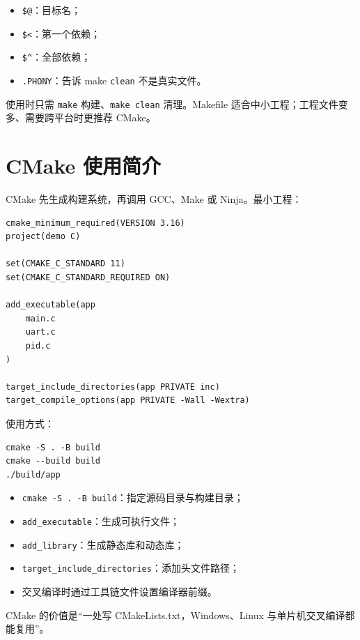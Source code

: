 \begin{itemize}
\item \texttt{\$@}：目标名；
\item \texttt{\$<}：第一个依赖；
\item \texttt{\${\string^}}：全部依赖；
\item \texttt{.PHONY}：告诉 make \texttt{clean} 不是真实文件。
\end{itemize}

使用时只需 \texttt{make} 构建、\texttt{make clean} 清理。Makefile 适合中小工程；工程文件变多、需要跨平台时更推荐 CMake。

\section{CMake 使用简介}

CMake 先生成构建系统，再调用 GCC、Make 或 Ninja。最小工程：

\begin{lstlisting}
cmake_minimum_required(VERSION 3.16)
project(demo C)

set(CMAKE_C_STANDARD 11)
set(CMAKE_C_STANDARD_REQUIRED ON)

add_executable(app
    main.c
    uart.c
    pid.c
)

target_include_directories(app PRIVATE inc)
target_compile_options(app PRIVATE -Wall -Wextra)
\end{lstlisting}

使用方式：

\begin{lstlisting}
cmake -S . -B build
cmake --build build
./build/app
\end{lstlisting}

\begin{itemize}
\item \texttt{cmake -S . -B build}：指定源码目录与构建目录；
\item \texttt{add\_executable}：生成可执行文件；
\item \texttt{add\_library}：生成静态库和动态库；
\item \texttt{target\_include\_directories}：添加头文件路径；
\item 交叉编译时通过工具链文件设置编译器前缀。
\end{itemize}

CMake 的价值是“一处写 CMakeLists.txt，Windows、Linux 与单片机交叉编译都能复用”。

